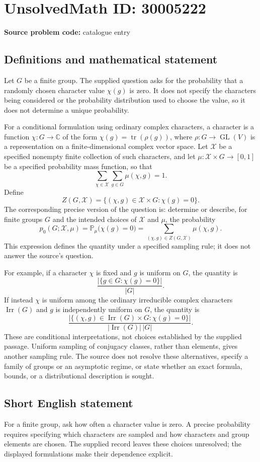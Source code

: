 \documentclass[11pt]{article}
\newcommand{\C}{\mathbb{C}}
\begin{document}
\section*{UnsolvedMath ID: 30005222}
\textbf{Source problem code:} catalogue entry
\subsection{Definitions and mathematical statement}
Let \(G\) be a finite group. The supplied question asks for the probability that a randomly chosen character value \(\chi(g)\) is zero. It does not specify the characters being considered or the probability distribution used to choose the value, so it does not determine a unique probability.

For a conditional formulation using ordinary complex characters, a character is a function \(\chi\colon G\to\C\) of the form \(\chi(g)=\operatorname{tr}(\rho(g))\), where \(\rho\colon G\to\operatorname{GL}(V)\) is a representation on a finite-dimensional complex vector space. Let \(\mathcal X\) be a specified nonempty finite collection of such characters, and let \(\mu\colon\mathcal X\times G\to[0,1]\) be a specified probability mass function, so that
\[
\sum_{\chi\in\mathcal X}\sum_{g\in G}\mu(\chi,g)=1.
\]
Define
\[
Z(G,\mathcal X)=\{(\chi,g)\in\mathcal X\times G:\chi(g)=0\}.
\]
The corresponding precise version of the question is: determine or describe, for finite groups \(G\) and the intended choices of \(\mathcal X\) and \(\mu\), the probability
\[
p_0(G;\mathcal X,\mu)
=\mathbb P_{\mu}\bigl(\chi(g)=0\bigr)
=\sum_{(\chi,g)\in Z(G,\mathcal X)}\mu(\chi,g).
\]
This expression defines the quantity under a specified sampling rule; it does not answer the source's question.

For example, if a character \(\chi\) is fixed and \(g\) is uniform on \(G\), the quantity is
\[
\frac{|\{g\in G:\chi(g)=0\}|}{|G|}.
\]
If instead \(\chi\) is uniform among the ordinary irreducible complex characters \(\operatorname{Irr}(G)\) and \(g\) is independently uniform on \(G\), the quantity is
\[
\frac{|\{(\chi,g)\in\operatorname{Irr}(G)\times G:\chi(g)=0\}|}
{|\operatorname{Irr}(G)|\,|G|}.
\]
These are conditional interpretations, not choices established by the supplied passage. Uniform sampling of conjugacy classes, rather than elements, gives another sampling rule. The source does not resolve these alternatives, specify a family of groups or an asymptotic regime, or state whether an exact formula, bounds, or a distributional description is sought.
\subsection{Short English statement}
For a finite group, ask how often a character value is zero. A precise probability requires specifying which characters are sampled and how characters and group elements are chosen. The supplied record leaves these choices unresolved; the displayed formulations make their dependence explicit.
\end{document}
